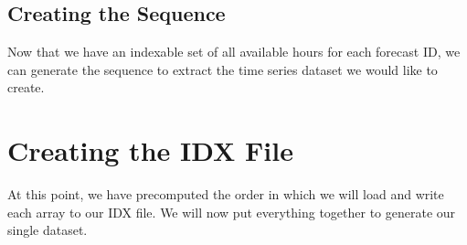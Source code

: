 \documentclass[
  letterpaper,
  DIV=11,
  numbers=noendperiod]{scrreprt}
\begin{document}
\subsection{Creating the Sequence}\label{creating-the-sequence}

Now that we have an indexable set of all available hours for each
forecast ID, we can generate the sequence to extract the time series
dataset we would like to create.

\section{Creating the IDX File}\label{creating-the-idx-file}

At this point, we have precomputed the order in which we will load and
write each array to our IDX file. We will now put everything together to
generate our single dataset.
\end{document}
